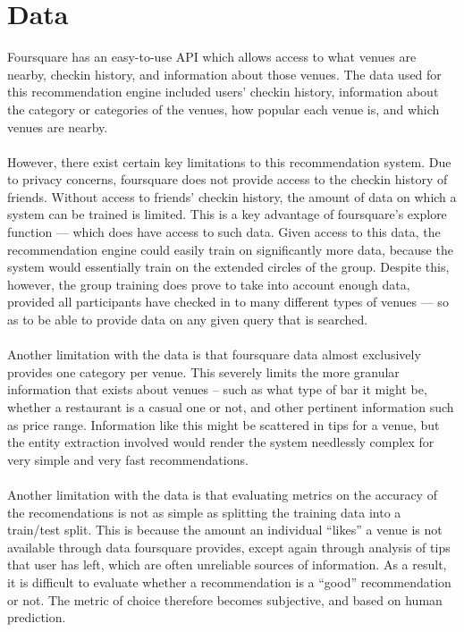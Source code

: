 \documentclass[11pt]{article}
\begin{document}
\section{Data}
Foursquare has an easy-to-use API which allows access to what venues are nearby, checkin history, and information about those venues. 
The data used for this recommendation engine included users' checkin history, information about the category or categories of the
venues, how popular each venue is, and which venues are nearby.\\
\\
However, there exist certain key limitations to this recommendation system. Due to privacy concerns, foursquare does not provide access
to the checkin history of friends. Without access to friends' checkin history, the amount of data
on which a system can be trained is limited. This is a key advantage of foursquare's explore function --- which does have access to such
data. Given access to this data, the recommendation engine could easily train on significantly more data, because the system would 
essentially train on the extended circles of the group. Despite this, however, the group training does prove to take into account enough 
data, provided all participants have checked in to many different types of venues --- so as to be able to provide data on any given
query that is searched.\\
\\
Another limitation with the data is that foursquare data almost exclusively provides one category per venue. This severely limits the more
granular information that exists about venues – such as what type of bar it might be, whether a restaurant is a casual one or not, and other
pertinent information such as price range. Information like this might be scattered in tips for a venue, but the entity extraction involved 
would render the system needlessly complex for very simple and very fast recommendations.\\
\\
Another limitation with the data is that evaluating metrics on the accuracy of the recomendations is not as simple as splitting the training
data into a train/test split. This is because the amount an individual ``likes'' a venue is not available through data foursquare provides,
except again through analysis of tips that user has left, which are often unreliable sources of information. As a result, it is difficult to
evaluate whether a recommendation is a ``good'' recommendation or not. The metric of choice therefore becomes subjective, and based on 
human prediction.
\end{document}
